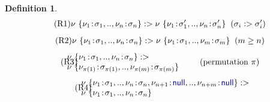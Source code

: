 \documentclass[preprint]{sigplanconf}
\newcommand{\kvd}[1]{\textnormal{\textcolor{kvdclr}{\sffamily #1}}}
\newtheorem{definition}{Definition}
\begin{document}
\begin{definition}
\noindent{}
\begin{align}
\hspace{-1em}
\label{eq:sub-record1}\tag{R1}
 \nu~\{ \nu_1\!:\!\sigma_1, .., \nu_n\!:\!\sigma_n \} :> 
 \nu~\{ \nu_1\!:\!\sigma_1', .., \nu_n\!:\!\sigma_n' \}
 \;\; (\sigma_i :> \sigma_i')
\end{align}
\vspace{-1.4em}
\begin{align}
\hspace{-1em}
\label{eq:sub-record2}\tag{R2}
 \nu~\{ \nu_1\!:\!\sigma_1, .., \nu_n\!:\!\sigma_n \} :> 
 \nu~\{ \nu_1\!:\!\sigma_1, .., \nu_m\!:\!\sigma_m \}
 \;\; (m \geq n)
\end{align}
\vspace{-1.0em}
\begin{align}
\label{eq:sub-record3}\tag{R3}
\hspace{-1.75em}
\begin{array}{l}
 \nu~\{ \nu_1\!:\!\sigma_1, .., \nu_n\!:\!\sigma_n \} :> \\
 \nu~\{ \nu_{\pi(1)}\!:\!\sigma_{\pi(1)}, .., \nu_{\pi(m)}\!:\!\sigma_{\pi(m)} \}
\end{array} \qquad &(\textnormal{permutation}~\pi)
\end{align}
\vspace{-0.6em}
\begin{align}
\label{eq:sub-record4}\tag{R4}
\hspace{-1.75em}
\begin{array}{l}
 \nu~\{ \nu_1\!:\!\sigma_1, .., \nu_n\!:\!\sigma_n, \nu_{n+1}\!:\!\kvd{null}, .., \nu_{n+m}\!:\!\kvd{null} \} :> \\
 \nu~\{ \nu_1\!:\!\sigma_1, .., \nu_n\!:\!\sigma_n \}
\end{array}
\end{align}
\end{definition}

\end{document}
